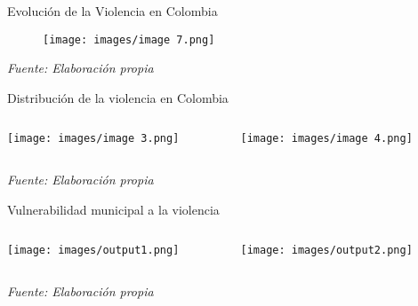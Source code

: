 \begin{frame}{Evolución de la Violencia en Colombia}
    \begin{figure}[ht]
        \centering
        \texttt{[image: images/image 7.png]}
    \end{figure}
    \centering
    \footnotesize\textit{Fuente: Elaboración propia}
\end{frame}

\begin{frame}{Distribución de la violencia en Colombia}
    \begin{columns}[T]
        \begin{column}{0.48\textwidth}
            \centering
            \texttt{[image: images/image 3.png]}
        \end{column}
        
        \begin{column}{0.48\textwidth}
            \centering
            \texttt{[image: images/image 4.png]}
        \end{column}
    \end{columns}
    \vspace{0.2cm}
    \centering
    \footnotesize\textit{Fuente: Elaboración propia}
\end{frame}


\begin{frame}{Vulnerabilidad municipal a la violencia}
    \begin{columns}[T]
        \begin{column}{0.48\textwidth}
            \centering
            \texttt{[image: images/output1.png]}
        \end{column}
        
        \begin{column}{0.48\textwidth}
            \centering
            \texttt{[image: images/output2.png]}
        \end{column}
    \end{columns}
    \vspace{0.2cm}
    \centering
    \footnotesize\textit{Fuente: Elaboración propia}
\end{frame}